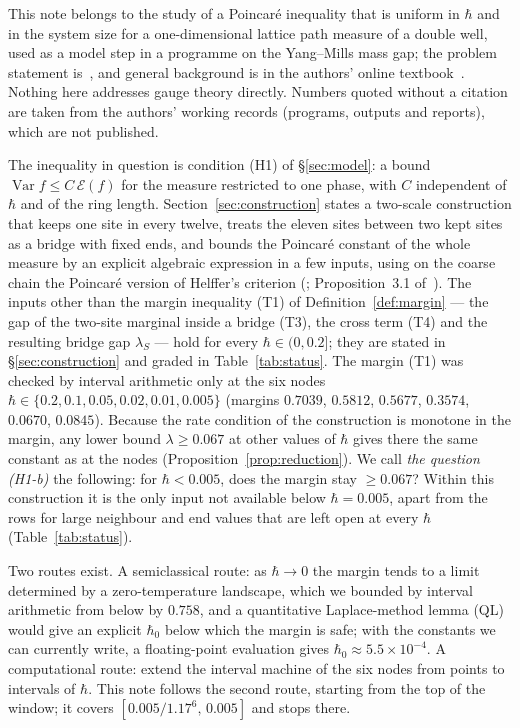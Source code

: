 \documentclass[11pt,a4paper]{article}
\theoremstyle{definition}
\theoremstyle{remark}
\DeclareMathOperator{\Var}{Var}
\begin{document}
{\sloppy This note belongs to the study of a Poincaré inequality that is uniform in $\hbar$ and in the system size for a one-dimensional lattice path measure of a double well, used as a model step in a programme on the Yang--Mills mass gap; the problem statement is~\cite{JW}, and general background is in the authors' online textbook~\cite{KSR}. Nothing here addresses gauge theory directly. Numbers quoted without a citation are taken from the authors' working records (programs, outputs and reports), which are not published.\par}

The inequality in question is condition (H1) of \S\ref{sec:model}: a bound $\Var f\le C\,\mathcal E(f)$ for the measure restricted to one phase, with $C$ independent of $\hbar$ and of the ring length. Section~\ref{sec:construction} states a two-scale construction that keeps one site in every twelve, treats the eleven sites between two kept sites as a bridge with fixed ends, and bounds the Poincaré constant of the whole measure by an explicit algebraic expression in a few inputs, using on the coarse chain the Poincaré version of Helffer's criterion (\cite{He}; Proposition~3.1 of~\cite{Le}). The inputs other than the margin inequality (T1) of Definition~\ref{def:margin} --- the gap of the two-site marginal inside a bridge (T3), the cross term (T4) and the resulting bridge gap $\lambda_S$ --- hold for every $\hbar\in(0,0.2]$; they are stated in \S\ref{sec:construction} and graded in Table~\ref{tab:status}. The margin (T1) was checked by interval arithmetic only at the six nodes $\hbar\in\{0.2,0.1,0.05,0.02,0.01,0.005\}$ (margins $0.7039$, $0.5812$, $0.5677$, $0.3574$, $0.0670$, $0.0845$). Because the rate condition of the construction is monotone in the margin, any lower bound $\lambda\ge0.067$ at other values of $\hbar$ gives there the same constant as at the nodes (Proposition~\ref{prop:reduction}). We call \emph{the question (H1-b)} the following: for $\hbar<0.005$, does the margin stay $\ge0.067$? Within this construction it is the only input not available below $\hbar=0.005$, apart from the rows for large neighbour and end values that are left open at every $\hbar$ (Table~\ref{tab:status}).

Two routes exist. A semiclassical route: as $\hbar\to0$ the margin tends to a limit determined by a zero-temperature landscape, which we bounded by interval arithmetic from below by $0.758$, and a quantitative Laplace-method lemma (QL) would give an explicit $\hbar_0$ below which the margin is safe; with the constants we can currently write, a floating-point evaluation gives $\hbar_0\approx5.5\times10^{-4}$. A computational route: extend the interval machine of the six nodes from points to intervals of $\hbar$. This note follows the second route, starting from the top of the window; it covers $[0.005/1.17^6,\,0.005]$ and stops there.
\end{document}
